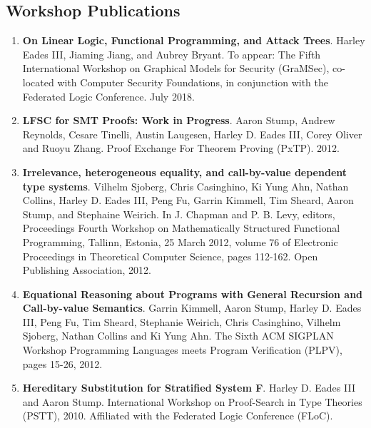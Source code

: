 \documentclass{article}
\begin{document}
  \subsection{Workshop Publications}
  \begin{enumerate}

  \item \textbf{On Linear Logic, Functional Programming, and Attack
    Trees}.  Harley Eades III, Jiaming Jiang, and Aubrey Bryant.  To
    appear: The Fifth International Workshop on Graphical Models for
    Security (GraMSec), co-located with Computer Security Foundations,
    in conjunction with the Federated Logic Conference. July 2018.
    
  \item \textbf{LFSC for SMT Proofs: Work in Progress}.
    Aaron Stump, Andrew Reynolds, Cesare Tinelli, Austin Laugesen, Harley D. Eades III, Corey Oliver and Ruoyu Zhang. 
    Proof Exchange For Theorem Proving (PxTP). 2012.
    
  \item \textbf{Irrelevance, heterogeneous equality, and call-by-value
    dependent type systems}.  Vilhelm Sjoberg, Chris Casinghino, Ki
    Yung Ahn, Nathan Collins, Harley D. Eades III, Peng Fu, Garrin
    Kimmell, Tim Sheard, Aaron Stump, and Stephaine Weirich.  In
    J. Chapman and P. B. Levy, editors, Proceedings Fourth Workshop on
    Mathematically Structured Functional Programming, Tallinn,
    Estonia, 25 March 2012, volume 76 of Electronic Proceedings in
    Theoretical Computer Science, pages 112-162. Open Publishing
    Association, 2012.
    
  \item \textbf{Equational Reasoning about Programs with General Recursion and Call-by-value Semantics}.
    Garrin Kimmell, Aaron Stump, Harley D. Eades III, Peng Fu, Tim Sheard, Stephanie Weirich, 
    Chris Casinghino, Vilhelm Sjoberg, Nathan Collins and Ki Yung Ahn. 
    The Sixth ACM SIGPLAN Workshop Programming Languages meets Program Verification (PLPV), pages 15-26, 2012. 
    
  \item \textbf{Hereditary Substitution for Stratified System F}. Harley D. Eades III and Aaron Stump. 
    International Workshop on Proof-Search in Type Theories (PSTT), 2010. Affiliated with 
    the Federated Logic Conference (FLoC).
  \end{enumerate}
\end{document}
